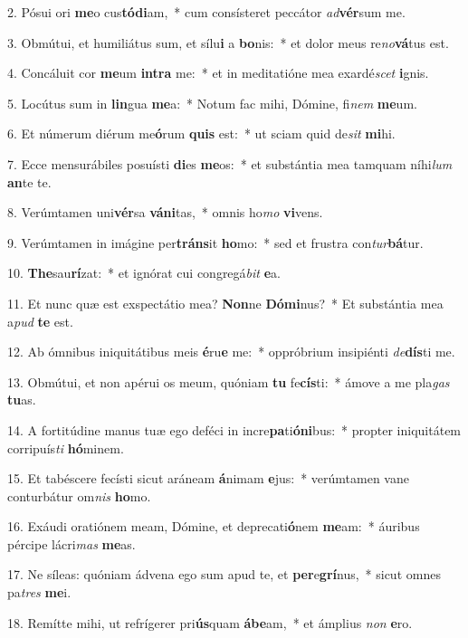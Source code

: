 2. Pósui ori \textbf{me}o cus\textbf{tó}\textbf{di}am,~*  cum consísteret peccátor \textit{ad}\textbf{vér}sum me.\

3. Obmútui, et humiliátus sum, et sílu\textbf{i} a \textbf{bo}nis:~*  et dolor meus re\textit{no}\textbf{vá}tus est.\

4. Concáluit cor \textbf{me}um \textbf{in}\textbf{tra} me:~*  et in meditatióne mea exardé\textit{scet} \textbf{i}gnis.\

5. Locútus sum in \textbf{lin}gua \textbf{me}a:~*  Notum fac mihi, Dómine, fi\textit{nem} \textbf{me}um.\

6. Et númerum diérum me\textbf{ó}rum \textbf{quis} est:~*  ut sciam quid de\textit{sit} \textbf{mi}hi.\

7. Ecce mensurábiles posuísti \textbf{di}es \textbf{me}os:~*  et substántia mea tamquam níhi\textit{lum} \textbf{an}te te.\

8. Verúmtamen uni\textbf{vér}sa \textbf{vá}\textbf{ni}tas,~*  omnis ho\textit{mo} \textbf{vi}vens.\

9. Verúmtamen in imágine per\textbf{tráns}it \textbf{ho}mo:~*  sed et frustra con\textit{tur}\textbf{bá}tur.\

10. \textbf{The}sau\textbf{rí}zat:~*  et ignórat cui congregá\textit{bit} \textbf{e}a.\

11. Et nunc quæ est exspectátio mea? \textbf{Non}ne \textbf{Dó}\textbf{mi}nus?~*  Et substántia mea a\textit{pud} \textbf{te} est.\

12. Ab ómnibus iniquitátibus meis \textbf{é}ru\textbf{e} me:~*  oppróbrium insipiénti \textit{de}\textbf{dís}ti me.\

13. Obmútui, et non apérui os meum, quóniam \textbf{tu} fe\textbf{cís}ti:~*  ámove a me pla\textit{gas} \textbf{tu}as.\

14. A fortitúdine manus tuæ ego deféci in incre\textbf{pa}ti\textbf{ó}\textbf{ni}bus:~*  propter iniquitátem corripuís\textit{ti} \textbf{hó}minem.\

15. Et tabéscere fecísti sicut aráneam \textbf{á}nimam \textbf{e}jus:~*  verúmtamen vane conturbátur om\textit{nis} \textbf{ho}mo.\

16. Exáudi oratiónem meam, Dómine, et deprecati\textbf{ó}nem \textbf{me}am:~*  áuribus pércipe lácri\textit{mas} \textbf{me}as.\

17. Ne síleas: quóniam ádvena ego sum apud te, et \textbf{per}e\textbf{grí}nus,~*  sicut omnes pa\textit{tres} \textbf{me}i.\

18. Remítte mihi, ut refrígerer pri\textbf{ús}quam \textbf{á}\textbf{be}am,~*  et ámplius \textit{non} \textbf{e}ro.\

